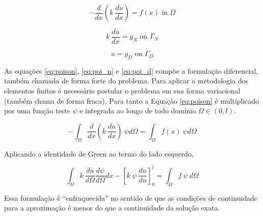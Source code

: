     \begin{equation}
      \label{eq:poison}
    -  \frac{d }{d x} \left (k \ \frac{d u}{d x} \right ) = f(x) \text{ in } \Omega
    \end{equation}

    \begin{equation}
      \label{eq:poi_n}
     k \ \frac{d u}{d x} = g_N \text{ on } \Gamma_N
   \end{equation}

   \begin{equation}
     \label{eq:poi_d}
    u = g_D \text{ on } \Gamma_D
   \end{equation}

   As equações \ref{eq:poison}, \ref{eq:poi_n} e \ref{eq:poi_d} compõe a
   formulação diferencial, também chamada de forma forte do problema. Para
   aplicar a metodologia dos elementos finitos é necessário postular o problema
   em sua forma variacional (também chama de forma fraca). Para tanto a Equação
   \ref{eq:poison} é multiplicado por uma função teste $\psi$ e integrada ao
   longo de todo domínio $\Omega \in (0, l)$.

   \begin{equation}
     \label{eq:poison_weak}
   - \int_\Omega \frac{d}{d x} \left (k \ \frac{d u}{d x} \right ) \ \psi d\Omega = \int_\Omega f(x) \ \psi d \Omega
   \end{equation}

   Aplicando a identidade de Green ao termo do lado esquerdo,
   
   \begin{equation}
     \label{eq:poison_weak_2}
    \int_\Omega k \ \frac{d u}{d \Omega} \frac{d \psi}{d \Omega} dx - \left[k \ \psi \ \frac{d u}{d n}\right]_0^l = \int_\Omega f \ \psi \ d \Omega
  \end{equation}

  Essa formulação é ``enfraquecida'' no sentido de que as condições de
  continuidade para a aproximação é menor do que a continuidade da solução exata.
  
